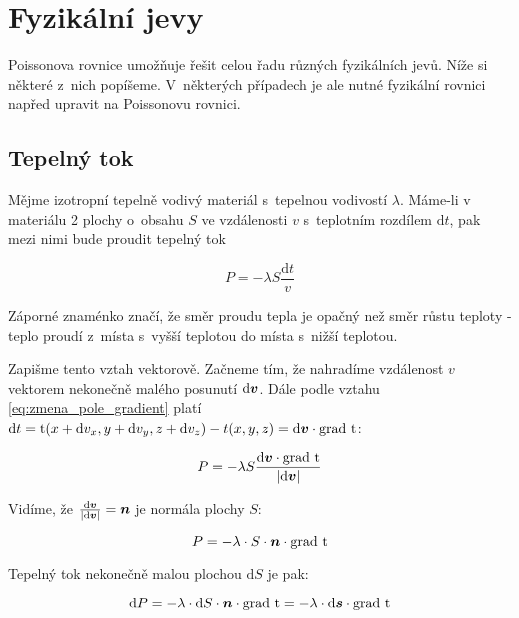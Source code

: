 \chapter{Fyzikální jevy}

Poissonova rovnice umožňuje řešit celou řadu různých fyzikálních jevů. Níže si některé z~nich popíšeme. V~některých případech
je ale nutné fyzikální rovnici napřed upravit na Poissonovu rovnici.

\section{Tepelný tok}

Mějme izotropní tepelně vodivý materiál s~tepelnou vodivostí \(\lambda\). 
Máme-li v materiálu 2 plochy o~obsahu \(S\) ve vzdálenosti \(v\) s~teplotním rozdílem \(\mathrm{d}t\), pak mezi nimi bude proudit tepelný tok 

\begin{equation}
\label{eq:tepelny_tok_1}
P = -\lambda S \frac{\mathrm{d}t}{v}
\end{equation}

Záporné znaménko značí, že směr proudu tepla je opačný než směr růstu
teploty - teplo proudí z~místa s~vyšší teplotou do místa s~nižší teplotou. 

Zapišme tento vztah vektorově. 
Začneme tím, že nahradíme vzdálenost \(v\) vektorem nekonečně malého posunutí \(\mathrm{d}\boldsymbol{v}\). Dále podle vztahu \eqref{eq:zmena_pole_gradient} platí \(\mathrm{d}t = \mathrm{t}(x + \mathrm{d}v_x, y + \mathrm{d}v_y, z + \mathrm{d}v_z) - t(x, y, z) = \mathrm{d}\boldsymbol{v} \cdot \mathrm{grad} \ \mathrm{t}\):

\begin{equation}
P = -\lambda S \frac{\mathrm{d}\boldsymbol{v} \cdot \mathrm{grad} \ \mathrm{t}}{|\mathrm{d}\boldsymbol{v}|}
\end{equation}

Vidíme, že \(\frac{\mathrm{d}\boldsymbol{v}}{|\mathrm{d}\boldsymbol{v}|} = \boldsymbol{n}\) je normála plochy \(S\):

\begin{equation}
P = -\lambda \cdot S \cdot \boldsymbol{n} \cdot \mathrm{grad} \ \mathrm{t}
\end{equation}

Tepelný tok nekonečně malou plochou \(\mathrm{d}S\) je pak:

\begin{equation}
\mathrm{d}P = -\lambda \cdot \mathrm{d}S \cdot \boldsymbol{n} \cdot \mathrm{grad} \ \mathrm{t} = -\lambda \cdot \mathrm{d}\boldsymbol{s} \cdot \mathrm{grad} \ \mathrm{t}
\end{equation}

